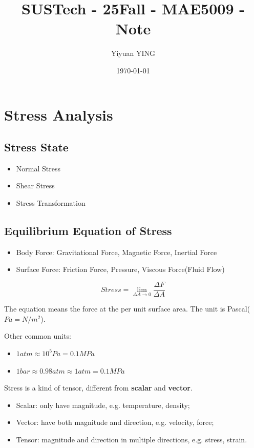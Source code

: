 \documentclass[en,hazy,cyan,8pt,normal]{elegantnote}
\title{SUSTech - 25Fall - MAE5009 - Note}
\author{Yiyuan YING}
\institute{Southern University of Science and Technology}
\date{\today}
\begin{document}
\maketitle

\section{Stress Analysis}
  \subsection{Stress State}
    \begin{itemize}
      \item Normal Stress
      \item Shear Stress
      \item Stress Transformation
    \end{itemize}

  \subsection{Equilibrium Equation of Stress}
    \begin{itemize}
      \item Body Force: Gravitational Force, Magnetic Force, Inertial Force
      \item Surface Force: Friction Force, Pressure, Viscous Force(Fluid Flow)
    \end{itemize}

    \begin{equation}\label{eq:001}
      Stress=\lim_{\Delta A \to 0} \frac{\Delta F}{\Delta A}
    \end{equation}

    The equation means the force at the per unit surface area. The unit is Pascal($Pa=N/m^2$).

    Other common units:
    \begin{itemize}
      \item $1 atm \approx 10^5 Pa = 0.1 MPa$
      \item $1 bar \approx 0.98 atm \approx 1 atm = 0.1 MPa$
    \end{itemize}

    Stress is a kind of tensor, different from \textbf{scalar} and \textbf{vector}.
    \begin{itemize}
      \item Scalar: only have magnitude, e.g. temperature, density;
      \item Vector: have both magnitude and direction, e.g. velocity, force;
      \item Tensor: magnitude and direction in multiple directions, e.g. stress, strain.
    \end{itemize}
\end{document}
